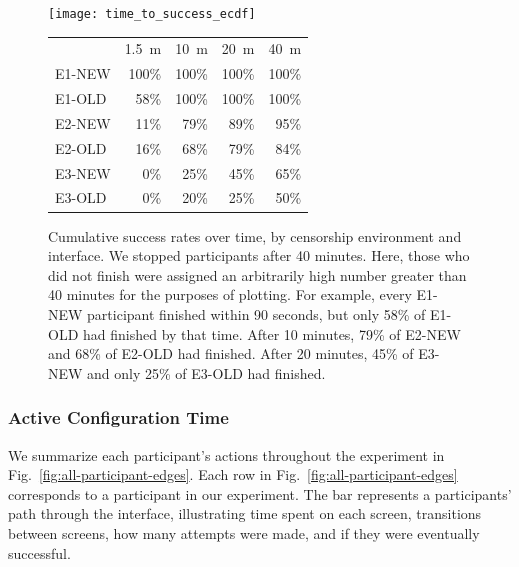 \documentclass[USenglish,oneside,twocolumn]{article}
\begin{document}
\begin{figure}[t]
\centering
\texttt{[image: time\_to\_success\_ecdf]}
	\begin{tabular}{l r r r r}
	& \multicolumn{1}{c}{1.5~m} & \multicolumn{1}{c}{10~m} & \multicolumn{1}{c}{20~m} & \multicolumn{1}{c}{40~m} \\
	\noalign{\hrule}
	E1-NEW & 100\% & 100\% & 100\% & 100\% \\
	E1-OLD & 58\% & 100\% & 100\% & 100\% \\
	E2-NEW & 11\% & 79\% & 89\% & 95\% \\
	E2-OLD & 16\% & 68\% & 79\% & 84\% \\
	E3-NEW & 0\% & 25\% & 45\% & 65\% \\
	E3-OLD & 0\% & 20\% & 25\% & 50\% \\
	\end{tabular}
\caption{
Cumulative success rates over time, by censorship environment and interface.
We stopped participants after 40 minutes. Here, those who did not finish were assigned
an arbitrarily high number greater than 40 minutes for the purposes of plotting. 
For example, every E1-NEW participant finished within 90 seconds,
but only 58\% of E1-OLD had finished by that time.
After 10 minutes, 79\% of E2-NEW and 68\% of E2-OLD had finished.
After 20 minutes, 45\% of E3-NEW and only 25\% of E3-OLD had finished.
}
\label{fig:time_to_success_ecdf}
\end{figure}

\subsubsection{Active Configuration Time} 
We summarize each participant's actions throughout the experiment in Fig.~\ref{fig:all-participant-edges}. Each row in Fig.~\ref{fig:all-participant-edges} corresponds to a participant in our experiment. The bar represents a participants' path through the interface, illustrating time spent on each screen, transitions between screens, how many attempts were made, and if they were eventually successful. 
\end{document}

